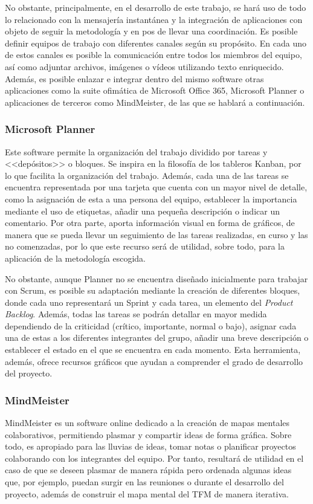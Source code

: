 No obstante, principalmente, en el desarrollo de este trabajo, se hará uso de todo lo relacionado con la mensajería instantánea y la integración de aplicaciones con objeto de seguir la metodología y en pos de llevar una coordinación. Es posible definir equipos de trabajo con diferentes canales según su propósito. En cada uno de estos canales es posible la comunicación entre todos los miembros del equipo, así como adjuntar archivos, imágenes o vídeos utilizando texto enriquecido. Además, es posible enlazar e integrar dentro del mismo software otras aplicaciones como la suite ofimática de Microsoft Office 365, Microsoft Planner o aplicaciones de terceros como MindMeister, de las que se hablará a continuación.

\subsubsection{Microsoft Planner}
Este software \cite{microsoftplanner} permite la organización del trabajo dividido por tareas y <<depósitos>> o bloques. Se inspira en la filosofía de los tableros Kanban, por lo que facilita la organización  del trabajo. Además, cada una de las tareas se encuentra representada por una tarjeta que cuenta con un mayor nivel de detalle, como la asignación de esta a una persona del equipo, establecer la importancia mediante el uso de etiquetas, añadir una pequeña descripción o indicar un comentario. Por otra parte, aporta información visual en forma de gráficos, de manera que se pueda llevar un seguimiento de las tareas realizadas, en curso y las no comenzadas, por lo que este recurso será de utilidad, sobre todo, para la aplicación de la metodología escogida.

No obstante, aunque Planner no se encuentra diseñado inicialmente para trabajar con Scrum, es posible su adaptación \cite{robertmulsow2018} mediante la creación de diferentes bloques, donde cada uno representará un Sprint y cada tarea, un elemento del \textit{Product Backlog}. Además, todas las tareas se podrán detallar en mayor medida dependiendo de la criticidad (crítico, importante, normal o bajo), asignar cada una de estas a los diferentes integrantes del grupo, añadir una breve descripción o establecer el estado en el que se encuentra en cada momento. Esta herramienta, además, ofrece recursos gráficos que ayudan a comprender el grado de desarrollo del proyecto.

\subsubsection{MindMeister}
MindMeister \cite{mindmeister} es un software online dedicado a la creación de mapas mentales colaborativos, permitiendo plasmar y compartir ideas de forma gráfica. Sobre todo, es apropiado para las lluvias de ideas, tomar notas o planificar proyectos colaborando con los integrantes del equipo. Por tanto, resultará de utilidad en el caso de que se deseen plasmar de manera rápida pero ordenada algunas ideas que, por ejemplo, puedan surgir en las reuniones o durante el desarrollo del proyecto, además de construir el mapa mental del \acs{TFM} de manera iterativa.


